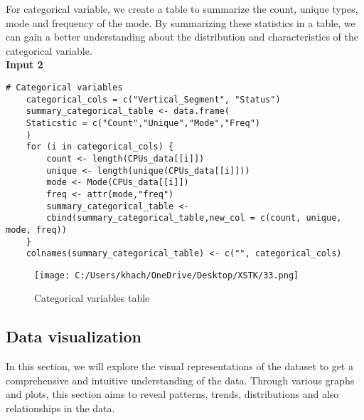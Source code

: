\documentclass[a4paper]{article}
\begin{document}
	\linebreak
	For categorical variable, we create a table to summarize the count, unique types, mode and frequency of the mode. By summarizing these statistics in a table, we can gain a better understanding about the distribution and characteristics of the categorical variable.\\
	\textbf{Input 2}
	\begin{lstlisting}[frame=single, backgroundcolor=\color{gray!10}, breaklines=true, columns=fullflexible]
	# Categorical variables
	categorical_cols = c("Vertical_Segment", "Status")
	summary_categorical_table <- data.frame(
	Staticstic = c("Count","Unique","Mode","Freq")
	)
	for (i in categorical_cols) {
		count <- length(CPUs_data[[i]])
		unique <- length(unique(CPUs_data[[i]]))
		mode <- Mode(CPUs_data[[i]])
		freq <- attr(mode,"freq")
		summary_categorical_table <- 
		cbind(summary_categorical_table,new_col = c(count, unique, mode, freq))
	}
	colnames(summary_categorical_table) <- c("", categorical_cols)
	\end{lstlisting}
		\begin{figure}[htbp]
		\centering
		\begin{adjustbox}{width=0.7\textwidth, frame}
			\texttt{[image: C:/Users/khach/OneDrive/Desktop/XSTK/33.png]}
		\end{adjustbox}
		\captionsetup{justification=centering}
		\vspace{0.5cm}
		\caption{Categorical variables table}
	\end{figure}
	\newpage
	\subsection{Data visualization}
	In this section, we will explore the visual representations of the dataset to get a comprehensive and intuitive understanding of the data. Through various graphs and plots, this section aims to reveal patterns, trends, distributions and also relationships in the data.
\end{document}
